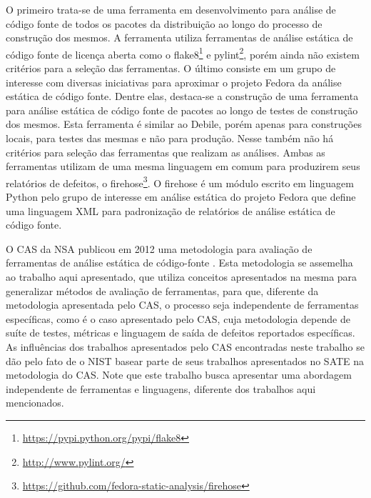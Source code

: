   O primeiro trata-se de uma ferramenta em desenvolvimento para análise de código fonte de todos os pacotes da distribuição ao longo do processo de construção dos mesmos. A ferramenta utiliza ferramentas de análise estática de código fonte de licença aberta como o flake8\footnote{\url{https://pypi.python.org/pypi/flake8}} e pylint\footnote{\url{http://www.pylint.org/}}, porém ainda não existem critérios para a seleção das ferramentas. O último consiste em um grupo de interesse com diversas iniciativas para aproximar o projeto Fedora da análise estática de código fonte. Dentre elas, destaca-se a construção de uma ferramenta para análise estática de código fonte de pacotes ao longo de testes de construção dos mesmos. Esta ferramenta é similar ao Debile, porém  apenas para construções locais, para testes das mesmas e não para produção. Nesse também não há critérios para seleção das ferramentas que realizam as análises. Ambas as ferramentas utilizam de uma mesma linguagem em comum para produzirem seus relatórios de defeitos, o firehose\footnote{\url{https://github.com/fedora-static-analysis/firehose}}. O firehose é um módulo escrito em linguagem Python pelo grupo de interesse em análise estática do projeto Fedora que define uma linguagem XML para padronização de relatórios de análise estática de código fonte.

  O CAS da NSA publicou em 2012 uma metodologia para avaliação de ferramentas de análise estática de código-fonte \cite{nsa}. Esta metodologia se assemelha ao trabalho aqui apresentado, que utiliza conceitos apresentados na mesma para generalizar métodos de avaliação de ferramentas, para que, diferente da metodologia apresentada pelo CAS, o processo seja independente de ferramentas específicas, como é o caso apresentado pelo CAS, cuja metodologia depende de suíte de testes, métricas e linguagem de saída de defeitos reportados específicas. As influências dos trabalhos apresentados pelo CAS encontradas neste trabalho se dão pelo fato de o NIST basear parte de seus trabalhos apresentados no SATE na metodologia do CAS. Note que este trabalho busca apresentar uma abordagem independente de ferramentas e linguagens, diferente dos trabalhos aqui mencionados.

